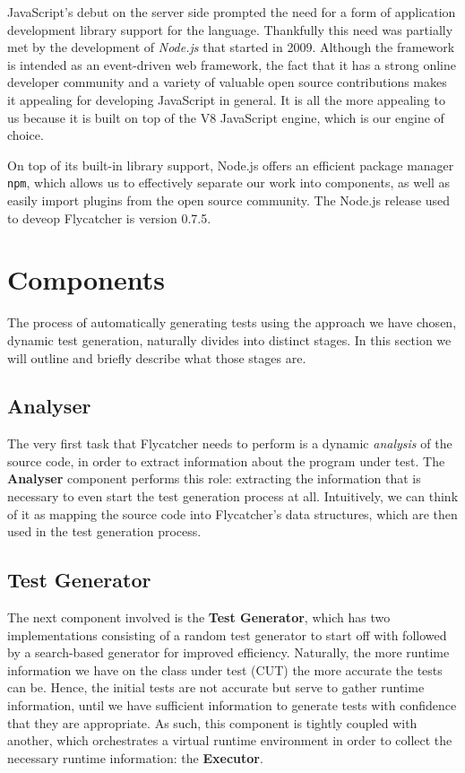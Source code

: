 JavaScript's debut on the server side prompted the need for a form of application development library support for the language. Thankfully this need was partially met by the development of \emph{Node.js} that started in 2009. Although the framework is intended as an event-driven web framework, the fact that it has a strong online developer community and a variety of valuable open source contributions makes it appealing for developing JavaScript in general. It is all the more appealing to us because it is built on top of the V8 JavaScript engine, which is our engine of choice.

On top of its built-in library support, Node.js offers an efficient package manager \texttt{npm}, which allows us to effectively separate our work into components, as well as easily import plugins from the open source community. The Node.js release used to deveop \textsf{Flycatcher} is version 0.7.5.


\section{Components}
The process of automatically generating tests using the approach we have chosen, dynamic test generation, naturally divides into distinct stages. In this section we will outline and briefly describe what those stages are.

\subsection{Analyser}
The very first task that \textsf{Flycatcher} needs to perform is a dynamic \emph{analysis} of the source code, in order to extract information about the program under test. The \textbf{Analyser} component performs this role: extracting the information that is necessary to even start the test generation process at all. Intuitively, we can think of it as mapping the source code into \textsf{Flycatcher}'s data structures, which are then used in the test generation process.

\subsection{Test Generator}
The next component involved is the \textbf{Test Generator}, which has two implementations consisting of a random test generator to start off with followed by a search-based generator for improved efficiency. Naturally, the more runtime information we have on the class under test (CUT) the more accurate the tests can be. Hence, the initial tests are not accurate but serve to gather runtime information, until we have sufficient information to generate tests with confidence that they are appropriate. As such, this component is tightly coupled with another, which orchestrates a virtual runtime environment in order to collect the necessary runtime information: the \textbf{Executor}.


